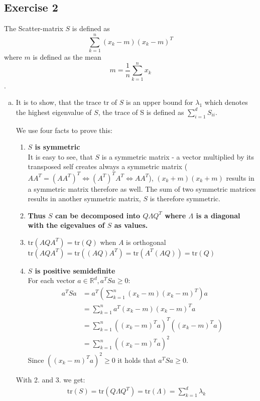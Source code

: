 \documentclass[10pt,a4paper]{article}
\newcommand{\tr}{\text{tr}}
\begin{document}
\subsection*{Exercise 2}
The Scatter-matrix $S$ is defined as $$\sum_{k = 1}^{n} (x_k - m)(x_k - m)^T$$ where $m$ is defined as the mean $$m = \frac{1}{n}\sum_{k=1}^{n}x_k$$. 
\begin{enumerate}[(a)]
\item
It is to show, that the trace $\tr$ of $S$ is an upper bound for $\lambda_1$ which denotes the highest eigenvalue of $S$, the trace of S is defined as $\sum^d_{i=1} S_{ii}$.

We use four facts to prove this:
\begin{enumerate}[1.]
    \item \textbf{$S$ is symmetric} \\
    It is easy to see, that $S$ is a symmetric matrix - a vector multiplied by its transposed self creates always a symmetric matrix ($AA^T = (AA^T)^T \Leftrightarrow (A^T)^TA^T \Leftrightarrow AA^T$), $(x_k + m)(x_k + m)$ results in a symmetric matrix therefore as well. The sum of two symmetric matrices results in another symmetric matrix, $S$ is therefore symmetric.
    \item \textbf{Thus $S$ can be decomposed into $Q\Lambda Q^T$ where $\Lambda$ is a diagonal with the eigevalues of $S$ as values.} %
    \item $\tr(AQA^T) = \tr(Q)$ when $A$ is orthogonal \\
    $\tr(AQA^T) = \tr((AQ)A^T) = \tr(A^T(AQ)) = \tr(Q)$
    \item \textbf{$S$ is positive semidefinite}\\
    For each vector $a \in \mathbb{R}^d, a^TSa \ge 0$:\\
    \begin{align*}
        a^TSa &= a^T(\sum_{k = 1}^{n} (x_k - m)(x_k - m)^T)a\\
        &= \sum_{k = 1}^{n} a^T(x_k - m)(x_k - m)^Ta\\
        &= \sum_{k = 1}^{n} ((x_k - m)^Ta)^T((x_k - m)^Ta)\\
        &= \sum_{k = 1}^{n} ((x_k - m)^Ta)^2
    \end{align*}
Since $((x_k - m)^Ta)^2 \ge 0$ it holds that $a^TSa \ge 0$.
\end{enumerate}
With 2. and 3. we get:
\begin{align*}
\tr(S) = \tr(Q\Lambda Q^T) = \tr(\Lambda) = \sum_{k = 1}^{d} \lambda_k

\end{align*}
\end{enumerate}
\end{document}
